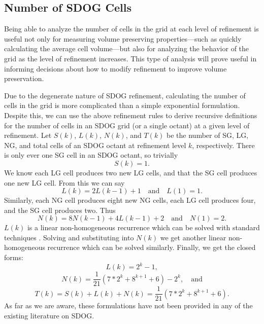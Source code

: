 \subsection{Number of SDOG Cells} \label{sec:sdog-numCells}
Being able to analyze the number of cells in the grid at each level of refinement is useful not only for measuring volume preserving properties---such as quickly calculating the average cell volume---but also for analyzing the behavior of the grid as the level of refinement increases.
This type of analysis will prove useful in informing decisions about how to modify refinement to improve volume preservation.


Due to the degenerate nature of SDOG refinement, calculating the number of cells in the grid is more complicated than a simple exponential formulation.
Despite this, we can use the above refinement rules to derive recursive definitions for the number of cells in an SDOG grid (or a single octant) at a given level of refinement.
Let $S(k)$, $L(k)$, $N(k)$, and $T(k)$ be the number of SG, LG, NG, and total cells of an SDOG octant at refinement level $k$, respectively.
There is only ever one SG cell in an SDOG octant, so trivially
%
\begin{equation}
S(k) = 1.
\label{eq:sg-num}
\end{equation}
%
We know each LG cell produces two new LG cells, and that the SG cell produces one new LG cell.
From this we can say
\begin{equation*}
L(k) = 2L(k-1) + 1 \quad\text{and}\quad L(1) = 1.
\label{eq:lg-recursive}
\end{equation*}
%
Similarly, each NG cell produces eight new NG cells, each LG cell produces four, and the SG cell produces two.
Thus
\begin{equation*}
N(k) = 8N(k-1) + 4L(k-1) + 2 \quad\text{and}\quad N(1) = 2.
\label{eq:ng-recursive}
\end{equation*}
%
$L(k)$ is a linear non-homogeneous recurrence which can be solved with standard techniques \cite{bellman1963differential}.
Solving and substituting into $N(k)$ we get another linear non-homogeneous recurrence which can be solved similarly.
Finally, we get the closed forms:
%
\begin{equation}
L(k) = 2^{k} - 1,
\label{eq:lg-closed}
\end{equation}
%
\begin{equation}
N(k) = \frac{1}{21} \left( 7*2^{k} + 8^{k+1} + 6 \right) - 2^{k}, \quad\text{and}
\label{eq:ng-closed}
\end{equation}
%
\begin{equation}
T(k) = S(k) + L(k) + N(k) = \frac{1}{21} \left( 7*2^{k} + 8^{k+1} + 6 \right).
\label{eq:t-closed}
\end{equation}
%
As far as we are aware, these formulations have not been provided in any of the existing literature on SDOG.


